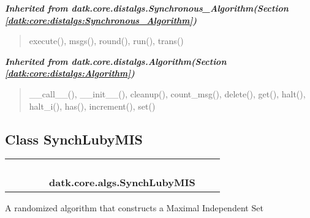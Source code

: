 \large{\textbf{\textit{Inherited from datk.core.distalgs.Synchronous\_Algorithm\textit{(Section \ref{datk:core:distalgs:Synchronous_Algorithm})}}}}

\begin{quote}
execute(), msgs(), round(), run(), trans()
\end{quote}

\large{\textbf{\textit{Inherited from datk.core.distalgs.Algorithm\textit{(Section \ref{datk:core:distalgs:Algorithm})}}}}

\begin{quote}
\_\_call\_\_(), \_\_init\_\_(), cleanup(), count\_msg(), delete(), get(), halt(), halt\_i(), has(), increment(), set()
\end{quote}


\subsection{Class SynchLubyMIS}

    \label{datk:core:algs:SynchLubyMIS}
\begin{tabular}{cccccccc}
\multicolumn{2}{r}{\settowidth{\BCL}{datk.core.distalgs.Algorithm}\multirow{2}{\BCL}{datk.core.distalgs.Algorithm}}
&&
&&
  \\\cline{3-3}
  &&\multicolumn{1}{c|}{}
&&
&&
  \\
\multicolumn{4}{r}{\settowidth{\BCL}{datk.core.distalgs.Synchronous\_Algorithm}\multirow{2}{\BCL}{datk.core.distalgs.Synchronous\_Algorithm}}
&&
  \\\cline{5-5}
  &&&&\multicolumn{1}{c|}{}
&&
  \\
&&&&\multicolumn{2}{l}{\textbf{datk.core.algs.SynchLubyMIS}}
\end{tabular}

A randomized algorithm that constructs a Maximal Independent Set

